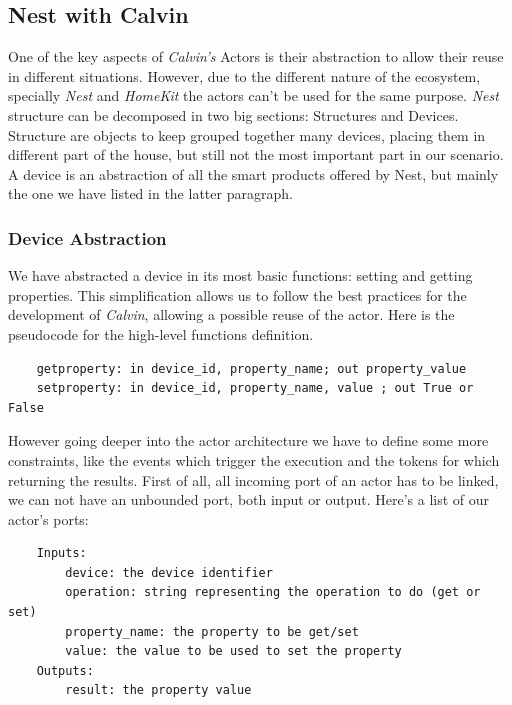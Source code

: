 \subsection{Nest with Calvin}

One of the key aspects of \textit{Calvin's} Actors is their abstraction
to allow their reuse in different situations. However, due to the different
nature of the ecosystem, specially \textit{Nest} and \textit{HomeKit} the actors
can't be used for the same purpose.
\textit{Nest} structure can be decomposed in two big sections: Structures and Devices.
Structure are objects to keep grouped together many devices, placing them in different part of the house,
but still not the most important part in our scenario.\\
A device is an abstraction of all the smart products offered by Nest, but mainly the one we have listed in the latter
paragraph.

\subsubsection{Device Abstraction}

We have abstracted a device in its most basic functions: setting and getting properties.
This simplification allows us to follow the best practices for the development of \textit{Calvin},
allowing a possible reuse of the actor. Here is the pseudocode for the high-level functions definition.

\begin{verbatim}
    getproperty: in device_id, property_name; out property_value
    setproperty: in device_id, property_name, value ; out True or False
\end{verbatim}


However going deeper into the actor architecture we have to define some more constraints,
like the events which trigger the execution and the tokens for which returning the results.
First of all, all incoming port of an actor has to be linked, we can not have an unbounded port,
both input or output. Here's a list of our actor's ports:\\

\begin{verbatim}
    Inputs:
        device: the device identifier
        operation: string representing the operation to do (get or set)
        property_name: the property to be get/set
        value: the value to be used to set the property
    Outputs:
        result: the property value
\end{verbatim}


